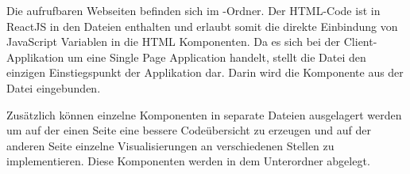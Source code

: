 Die aufrufbaren Webseiten befinden sich im -Ordner.
Der \ac{HTML}-Code ist in ReactJS in den  Dateien enthalten und erlaubt somit die direkte Einbindung von JavaScript Variablen in die \ac{HTML} Komponenten.
Da es sich bei der Client-Applikation um eine Single Page Application handelt, stellt die  Datei den einzigen Einstiegspunkt der Applikation dar.
Darin wird die Komponente  aus der Datei  eingebunden.

Zusätzlich können einzelne Komponenten in separate Dateien ausgelagert werden um auf der einen Seite eine bessere Codeübersicht zu erzeugen und auf der anderen Seite einzelne Visualisierungen an verschiedenen Stellen zu implementieren.
Diese Komponenten werden in dem Unterordner  abgelegt.

